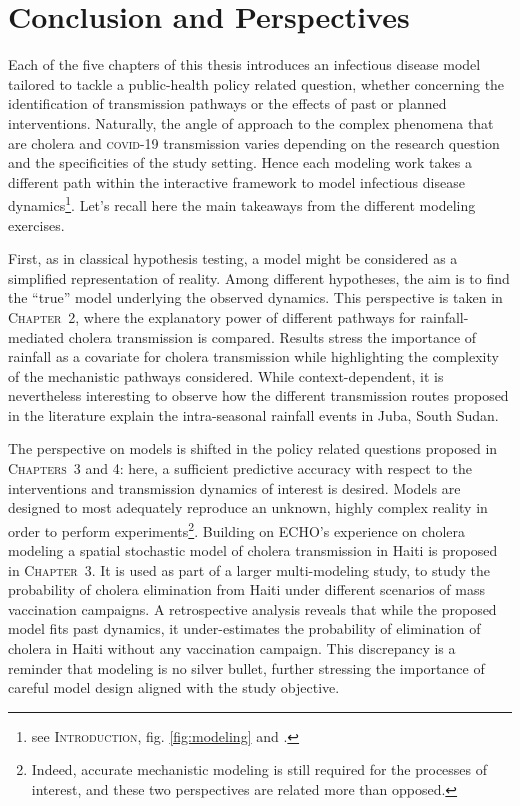 \chapter*{Conclusion and Perspectives}
Each of the five chapters of this thesis introduces an infectious disease model tailored to tackle a public-health policy related question, whether concerning the identification of transmission pathways or the effects of past or planned interventions. Naturally, the angle of approach to the complex phenomena that are cholera and \textsc{covid}-19 transmission varies depending on the research question and the specificities of the study setting. Hence each modeling work takes a different path within the interactive framework to model infectious disease dynamics\footnote{see \textsc{Introduction}, fig. \ref{fig:modeling} and .}. Let's recall here the main takeaways from the different modeling exercises.


First, as in classical hypothesis testing, a model might be considered as a simplified representation of reality. Among different hypotheses, the aim is to find the ``true'' model underlying the observed dynamics. This perspective is taken in \textsc{Chapter~2}, where the explanatory power of different pathways for rainfall-mediated cholera transmission is compared\cite{Rinaldo:Reassessment20102011:2012, Eisenberg:ExaminingRainfallCholera:2013}. Results stress the importance of rainfall as a covariate for cholera transmission while highlighting the complexity of the mechanistic pathways considered. While context-dependent, it is nevertheless interesting to observe how the different transmission routes proposed in the literature explain the intra-seasonal rainfall events in Juba, South Sudan.

The perspective on models is shifted in the policy related questions proposed in \textsc{Chapters~3} and 4: here, a sufficient predictive accuracy with respect to the interventions and transmission dynamics of interest is desired. Models are designed to most adequately reproduce an unknown, highly complex reality in order to perform experiments\footnote{Indeed, accurate mechanistic modeling is still required for the processes of interest, and these two perspectives are related more than opposed.}. Building on ECHO's experience on cholera modeling\cite{Rinaldo:RiverNetworksEcological:2020a} a spatial stochastic model of cholera transmission in Haiti is proposed in \textsc{Chapter~3}. It is used as part of a larger multi-modeling study\cite{Lee:AchievingCoordinatedNational:2020}, to study the probability of cholera elimination from Haiti under different scenarios of mass vaccination campaigns. A retrospective analysis reveals that while the proposed model fits past dynamics, it under-estimates the probability of elimination of cholera in Haiti without any vaccination campaign. This discrepancy is a reminder that modeling is no silver bullet, further stressing the importance of careful model design aligned with the study objective. 

